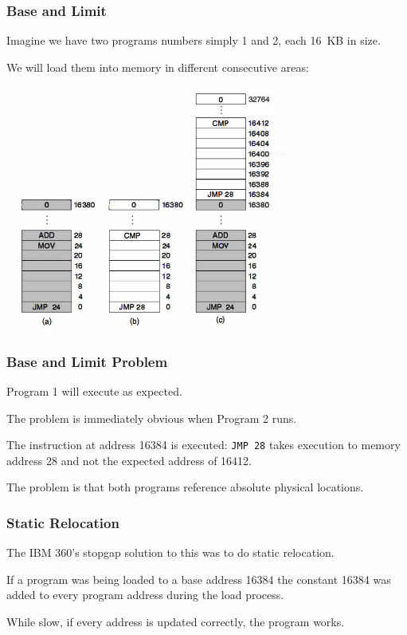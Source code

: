 \begin{frame}
\frametitle{Base and Limit}

Imagine we have two programs numbers simply 1 and 2, each 16~KB in size.

We will load them into memory in different consecutive areas:

\begin{center}
\includegraphics[width=0.70\textwidth]{images/os360.png}
\end{center}


\end{frame}

\begin{frame}
\frametitle{Base and Limit Problem}

Program 1 will execute as expected. 

The problem is immediately obvious when Program 2 runs. 

The instruction at address 16384 is executed: \texttt{JMP 28} takes execution to memory address 28 and not the expected address of 16412. 

The problem is that both programs reference absolute physical locations. 

\end{frame}

\begin{frame}
\frametitle{Static Relocation}

The IBM 360's stopgap solution to this was to do static relocation.

If a program was being loaded to a base address 16384 the constant 16384 was added to every program address during the load process. 

While slow, if every address is updated correctly, the program works.



\end{frame}

